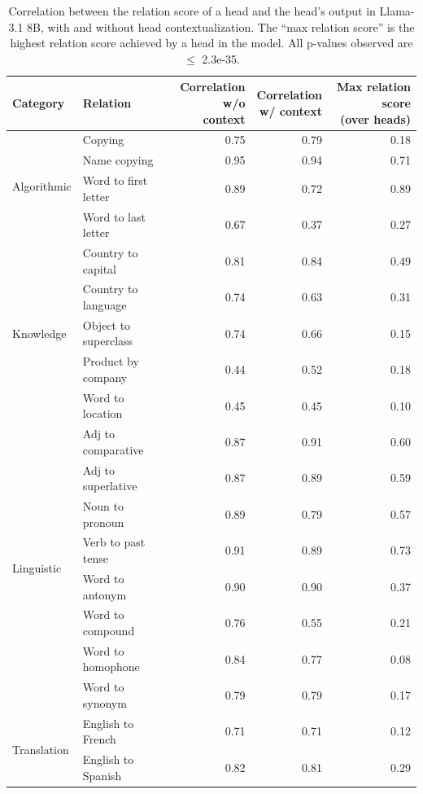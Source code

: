 \documentclass[11pt]{article}
\newcommand{\llamaThreeEightB}{Llama-3.1 8B}
\begin{document}
\begin{table}[p]
\centering
\footnotesize
\begin{tabular}{llrrr}
\toprule
Category & Relation & \makecell{Correlation\\w/o context} & \makecell{Correlation\\w/ context} & \makecell{Max relation score\\(over heads)} \\
\midrule
\multirow{4}{*}{Algorithmic} & Copying & 0.75 &  0.79 & 0.18 \\
 & Name copying & 0.95 & 0.94 &  0.71 \\
 & Word to first letter & 0.89 &  0.72 & 0.89 \\
 & Word to last letter & 0.67 & 0.37 &  0.27 \\
\midrule
\multirow{5}{*}{Knowledge} & Country to capital & 0.81 & 0.84 & 0.49 \\
 & Country to language & 0.74 & 0.63  & 0.31 \\
 & Object to superclass & 0.74 & 0.66 &  0.15 \\
 & Product by company & 0.44 &  0.52 & 0.18 \\
 & Word to location & 0.45 & 0.45 &  0.10 \\
\midrule

\multirow{8}{*}{Linguistic} & Adj to comparative & 0.87 & 0.91 &  0.60 \\
 & Adj to superlative & 0.87 & 0.89 &  0.59 \\
 & Noun to pronoun & 0.89 &  0.79 & 0.57 \\
 & Verb to past tense & 0.91 &  0.89 & 0.73 \\
 & Word to antonym & 0.90 &  0.90 &  0.37 \\
 & Word to compound & 0.76 & 0.55 & 0.21 \\
 & Word to homophone & 0.84 & 0.77 & 0.08 \\
 & Word to synonym & 0.79 & 0.79 & 0.17 \\
\midrule
\multirow{2}{*}{Translation} & English to French & 0.71 & 0.71 & 0.12 \\
 & English to Spanish & 0.82 & 0.81 & 0.29 \\
\bottomrule
\end{tabular}

\caption{Correlation between the relation score of a head and the head's output in \llamaThreeEightB{}, with and without head contextualization. The ``max relation score'' is the highest relation score achieved by a head in the model. All p-values observed are $\leq$ 2.3e-35.} 
\label{tab:Dynamic_results_llama_8_full}
\end{table}
\end{document}
